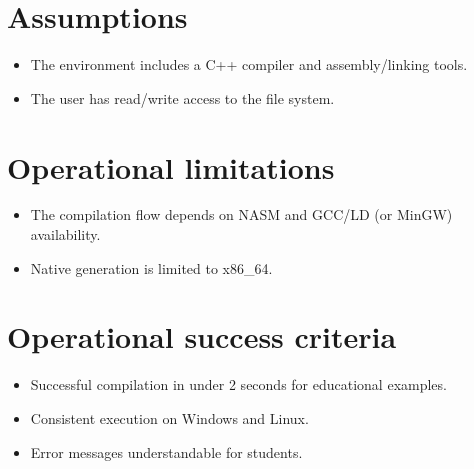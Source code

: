\documentclass[11pt,a4paper]{article}
\begin{document}
\section{Assumptions}
\begin{itemize}
    \item The environment includes a C++ compiler and assembly/linking tools.
    \item The user has read/write access to the file system.
\end{itemize}

\section{Operational limitations}
\begin{itemize}
    \item The compilation flow depends on NASM and GCC/LD (or MinGW) availability.
    \item Native generation is limited to x86\_64.
\end{itemize}

\section{Operational success criteria}
\begin{itemize}
    \item Successful compilation in under 2 seconds for educational examples.
    \item Consistent execution on Windows and Linux.
    \item Error messages understandable for students.
\end{itemize}
\end{document}
